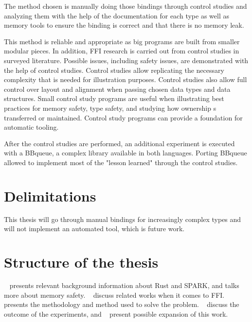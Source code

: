 \documentclass[nomenclature, english, bibtex]{kththesis}
\newcommand*{\generalExpl}[1]{\todo[inline]{#1}}
\newcommand*{\sweExpl}[1]{\todo[inline, backgroundcolor=kth-lightblue40]{#1}}  %
\begin{document}
The method chosen is manually doing those bindings through control studies and analyzing them with the help of the documentation for each type as well as memory tools to ensure the binding is correct and that there is no memory leak. 

This method is reliable and appropriate as big programs are built from smaller modular pieces. In addition, \gls{FFI} research is carried out from control studies in surveyed literature. Possible issues, including safety issues, are demonstrated with the help of control studies. Control studies allow replicating the necessary complexity that is needed for illustration purposes. Control studies also allow full control over layout and alignment when passing chosen data types and data structures.
Small control study programs are useful when illustrating best practices for memory safety, type safety, and studying how ownership s transferred or maintained.
Control study programs can provide a foundation for automatic tooling.

After the control studies are performed, an additional experiment is executed with a BBqueue, a complex library available in both languages. Porting BBqueue allowed to implement most of the "lesson learned" through the control studies.


\section{Delimitations}

This thesis will go through manual bindings for increasingly complex types and will not implement an automated tool, which is future work.

\section{Structure of the thesis}
~ presents relevant background information about Rust and SPARK, and talks more about memory safety.  
~ discuss related works when it comes to \gls{FFI}.   presents the methodology and method used to solve the problem. ~ discuss the outcome of the experiments, and ~ present possible expansion of this work.
\end{document}
